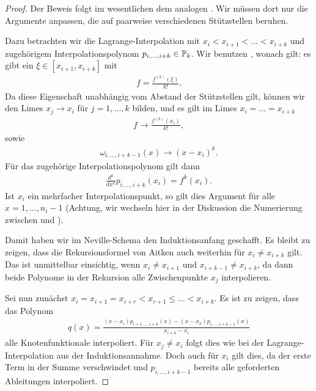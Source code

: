 \begin{proof}
  Der Beweis folgt im wesentlichen dem analogen
  . Wir müssen dort nur die Argumente
  anpassen, die auf paarweise verschiedenen Stützstellen beruhen.

  Dazu betrachten wir die Lagrange-Interpolation mit
  $x_i < x_{i+1}< \dots < x_{i+k}$ und zugehörigem
  Interpolationspolynom $p_{i,\dots,i+k} \in \P_k$. Wir benutzen
, wonach gilt: es gibt ein
$\xi\in[x_{i+1},x_{i+k}]$ mit
  \begin{gather}
    [x_i,\dots,x_{i+k}]f = \frac{f^{(k)}(\xi)}{k!}.
  \end{gather}
  Da diese Eigenschaft unabhängig vom Abstand der Stützstellen gilt,
  können wir den Limes $x_j \to x_i$ für $j=1,\dots,k$ bilden, und es
  gilt im Limes $x_i=\dots=x_{i+k}$
  \begin{gather}
    [x_i,\dots,x_{i+k}]f \to \frac{f^{(k)}(x_i)}{k!},
  \end{gather}
  sowie
  \begin{gather}
    \omega_{i,\dots,i+k-1}(x) \to (x-x_i)^{k}.
  \end{gather}
  Für das zugehörige Interpolationspolynom gilt dann
  \begin{gather}
    \frac{d^k}{dx^k} p_{i,\dots,i+k}(x_i) = f^{k}(x_i).
  \end{gather}
  Ist $x_i$ ein mehrfacher Interpolationspunkt, so gilt dies Argument für alle $x=1,\dots,n_i-1$ (Achtung, wir wechseln hier in der Diskussion die Numerierung zwischen  und ).
  
  Damit haben wir im Neville-Schema den Induktionsanfang geschafft. Es
  bleibt zu zeigen, dass die Rekursionsformel von Aitken auch
  weiterhin für $x_i \neq x_{i+k}$ gilt. Das ist unmittelbar
  einsichtig, wenn $x_i \neq x_{i+1}$ und $x_{i+k-1} \neq x_{i+k}$, da
  dann beide Polynome in der Rekursion alle Zwischenpunkte $x_j$
  interpolieren.

  Sei nun zunächst
  $x_i=x_{i+1}= x_{i+r} < x_{r+1} \le \dots < x_{i+k}$. Es ist zu
  zeigen, dass das Polynom
  \begin{gather}
    q(x) = \frac{(x-x_i) p_{i+1,\dots,i+k}(x)
      - (x-x_k) p_{i,\dots,i+k-1}(x)}{x_{i+k}-x_i}
  \end{gather}
  alle Knotenfunktionale interpoliert. Für $x_j\neq x_i$ folgt dies
  wie bei der Lagrange-Interpolation aus der Induktionsannahme. Doch
  auch für $x_i$ gilt dies, da der erste Term in der Summe
  verschwindet und $p_{i,\dots,i+k-1}$ bereits alle geforderten
  Ableitungen interpoliert.
\end{proof}

